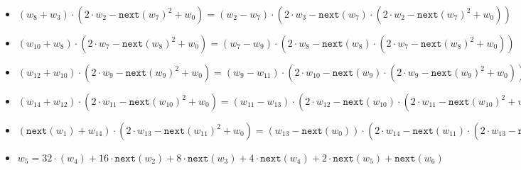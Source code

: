 \begin{itemize}
    \item $(w_{8} + w_{3}) \cdot (2 \cdot w_2 - \texttt{next}(w_7)^2 + w_{0}) = (w_2 - w_7) \cdot (2\cdot w_{3} - \texttt{next}(w_7) \cdot (2 \cdot w_2 - \texttt{next}(w_7)^2 + w_{0}))$
    \item $(w_{10} + w_{8}) \cdot (2 \cdot w_7 - \texttt{next}(w_8)^2 + w_{0}) = (w_7 - w_9) \cdot (2\cdot w_{8} - \texttt{next}(w_8) \cdot (2 \cdot w_7 - \texttt{next}(w_8)^2 + w_{0}))$
    \item $(w_{12} + w_{10}) \cdot (2 \cdot w_9 - \texttt{next}(w_9)^2 + w_{0}) = (w_9 - w_{11}) \cdot (2\cdot w_{10} - \texttt{next}(w_9) \cdot (2 \cdot w_9 - \texttt{next}(w_9)^2 + w_{0}))$
    \item $(w_{14} + w_{12}) \cdot  (2 \cdot w_{11} - \texttt{next}(w_{10})^2 + w_{0}) = (w_{11} - w_{13}) \cdot (2\cdot w_{12} - \texttt{next}(w_{10}) \cdot (2 \cdot w_{11} - \texttt{next}(w_{10})^2 + w_{0}))$
    \item $(\texttt{next}(w_{1}) + w_{14}) \cdot (2 \cdot w_{13} - \texttt{next}(w_{11})^2 + w_{0}) = (w_{13} - \texttt{next}(w_{0})) \cdot (2\cdot w_{14} - \texttt{next}(w_{11}) \cdot (2 \cdot w_{13} - \texttt{next}(w_{11})^2 + w_{0}))$ \\
    
    
    \item $w_5 = 32 \cdot (w_4) + 16 \cdot \texttt{next}(w_{2}) + 8 \cdot \texttt{next}(w_{3}) + 4 \cdot \texttt{next}(w_{4}) + 2 \cdot \texttt{next}(w_{5}) + \texttt{next}(w_{6})$
    \end{itemize}

